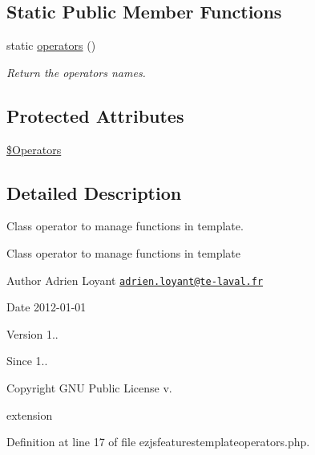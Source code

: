 \subsection*{Static Public Member Functions}
\begin{DoxyCompactItemize}
\item 
static \hyperlink{classextension_1_1ezextrafeatures_1_1autoloads_1_1e_z_j_s_features_template_operators_a16c3da4e7ebdaad1a9d7855800dbcfcd}{operators} ()
\begin{DoxyCompactList}\small\item\em Return the operators names. \end{DoxyCompactList}\end{DoxyCompactItemize}
\subsection*{Protected Attributes}
\begin{DoxyCompactItemize}
\item 
\hyperlink{classextension_1_1ezextrafeatures_1_1autoloads_1_1e_z_j_s_features_template_operators_a98a2d25e2dbe9c3569adb4a0e46ac0a4}{\$\-Operators}
\end{DoxyCompactItemize}


\subsection{Detailed Description}
Class operator to manage functions in template. 

Class operator to manage functions in template

\begin{DoxyAuthor}{Author}
Adrien Loyant \href{mailto:adrien.loyant@te-laval.fr}{\tt adrien.\-loyant@te-\/laval.\-fr}
\end{DoxyAuthor}
\begin{DoxyDate}{Date}
2012-\/01-\/01 
\end{DoxyDate}
\begin{DoxyVersion}{Version}
1.. 
\end{DoxyVersion}
\begin{DoxySince}{Since}
1.. 
\end{DoxySince}
\begin{DoxyCopyright}{Copyright}
G\-N\-U Public License v.
\end{DoxyCopyright}
extension 

Definition at line 17 of file ezjsfeaturestemplateoperators.\-php.



